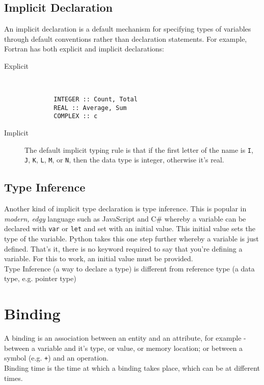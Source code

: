 \subsection{Implicit Declaration}
An implicit declaration is a default mechanism for specifying types of variables through default conventions rather than declaration statements. For example, Fortran has both explicit and implicit declarations:
\begin{description}
    \item[Explicit]\ 
    \begin{verbatim}
        INTEGER :: Count, Total
        REAL :: Average, Sum
        COMPLEX :: c
    \end{verbatim}
    \item[Implicit] The default implicit typing rule is that if the first letter of the name is \verb|I|, \verb|J|, \verb|K|, \verb|L|, \verb|M|, or \verb|N|, then the data type is integer, otherwise it's real.
\end{description}
\subsection{Type Inference}
Another kind of implicit type declaration is type inference. This is popular in \textit{modern, edgy} language such as JavaScript and C\# whereby a variable can be declared with \verb|var| or \verb|let| and set with an initial value. This initial value sets the type of the variable. Python takes this one step further whereby a variable is just defined. That's it, there is no keyword required to say that you're defining a variable. For this to work, an initial value must be provided.\\

Type Inference (a way to declare a type) is different from reference type (a data type, e.g. pointer type)

\section{Binding}
A binding is an association between an entity and an attribute, for example - between a variable and it's type, or value, or memory location; or between a symbol (e.g. \verb|+|) and an operation.\\

Binding time is the time at which a binding takes place, which can be at different times. 

